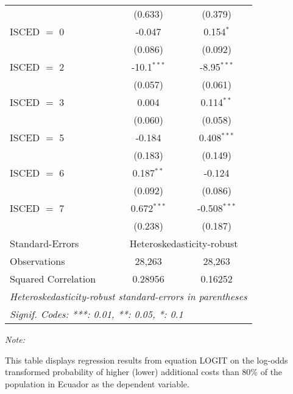 \begin{table}[htbp!]
\begin{adjustbox}{width = 1\textwidth, max height = 0.95\textheight, center}
\begin{threeparttable}[b]
\begin{tabular}{lcc}
                                 & (0.633)        & (0.379)\\   
            ISCED $=$ 0          & -0.047         & 0.154$^{*}$\\   
                                 & (0.086)        & (0.092)\\   
            ISCED $=$ 2          & -10.1$^{***}$  & -8.95$^{***}$\\   
                                 & (0.057)        & (0.061)\\   
            ISCED $=$ 3          & 0.004          & 0.114$^{**}$\\   
                                 & (0.060)        & (0.058)\\   
            ISCED $=$ 5          & -0.184         & 0.408$^{***}$\\   
                                 & (0.183)        & (0.149)\\   
            ISCED $=$ 6          & 0.187$^{**}$   & -0.124\\   
                                 & (0.092)        & (0.086)\\   
            ISCED $=$ 7          & 0.672$^{***}$  & -0.508$^{***}$\\   
                                 & (0.238)        & (0.187)\\   
            \midrule 
            Standard-Errors & \multicolumn{2}{c}{Heteroskedasticity-robust} \\ 
            Observations         & 28,263         & 28,263\\  
            Squared Correlation  & 0.28956        & 0.16252\\  
            \midrule \midrule
            \multicolumn{3}{l}{\emph{Heteroskedasticity-robust standard-errors in parentheses}}\\
            \multicolumn{3}{l}{\emph{Signif. Codes: ***: 0.01, **: 0.05, *: 0.1}}\\
         \end{tabular}
         
         \begin{tablenotes}\item \medskip \textit{Note:}
            \item This table displays regression results from equation LOGIT on the log-odds transformed probability of higher (lower) additional costs than 80\% of the population in Ecuador as the dependent variable. 
         \end{tablenotes}
      \end{threeparttable}
   \end{adjustbox}
\end{table}


